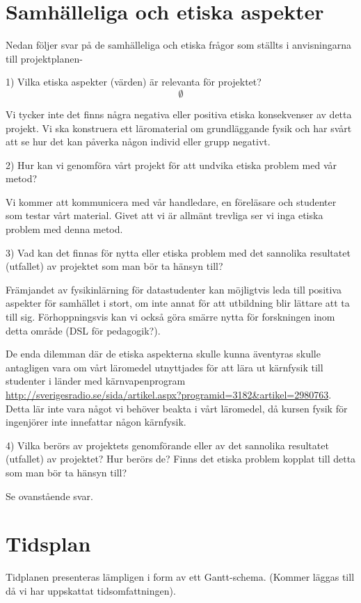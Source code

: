 \documentclass[12pt,a4paper]{article}
\begin{document}
\section{Samhälleliga och etiska aspekter}


Nedan följer svar på de samhälleliga och etiska frågor som ställts i anvisningarna till projektplanen-

1) Vilka etiska  aspekter (värden) är relevanta för projektet?
\[
\emptyset
\]

Vi tycker inte det finns några negativa eller positiva etiska konsekvenser av detta projekt. Vi ska konstruera ett läromaterial om grundläggande fysik och har svårt att se hur det kan påverka någon individ eller grupp negativt.

2) Hur kan vi genomföra vårt projekt för att undvika etiska problem med vår metod?

Vi kommer att kommunicera med vår handledare, en föreläsare och studenter som testar vårt material. Givet att vi är allmänt trevliga ser vi inga etiska problem med denna metod.

3) Vad kan det finnas för nytta eller etiska problem med det sannolika resultatet (utfallet) av projektet som man bör ta hänsyn till?

Främjandet av fysikinlärning för datastudenter kan möjligtvis leda till positiva aspekter för samhället i stort, om inte annat för att utbildning blir lättare att ta till sig. Förhoppningsvis kan vi också göra smärre nytta för forskningen inom detta område (DSL för pedagogik?).

De enda dilemman där de etiska aspekterna skulle kunna äventyras skulle antagligen vara om vårt läromedel utnyttjades för att lära ut kärnfysik till studenter i länder med kärnvapenprogram \url{http://sverigesradio.se/sida/artikel.aspx?programid=3182&artikel=2980763}.
   Detta lär inte vara något vi behöver beakta i vårt läromedel, då kursen fysik för ingenjörer inte innefattar någon kärnfysik.

4)  Vilka berörs av projektets genomförande eller av det sannolika resultatet (utfallet) av projektet? Hur berörs de? Finns det etiska problem kopplat till detta som man bör ta hänsyn till?

Se ovanstående svar.

\section{Tidsplan}

Tidplanen presenteras lämpligen i form av ett Gantt-schema.
(Kommer läggas till då vi har uppskattat tidsomfattningen).
\end{document}
